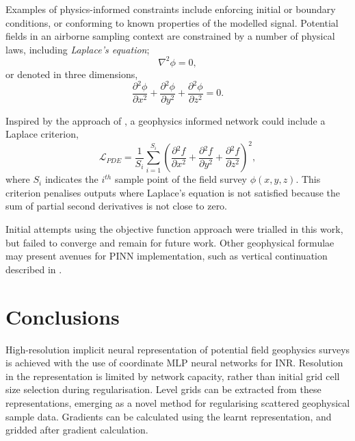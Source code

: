 \documentclass[manuscript.tex]{subfiles}
\begin{document}
Examples of physics-informed constraints include enforcing initial or boundary conditions, or conforming to known properties of the modelled signal.
Potential fields in an airborne sampling context are constrained by a number of physical laws, including \emph{Laplace's equation};
\[
    \nabla^2 \phi = 0,
\]
or denoted in three dimensions,
\begin{equation}
    \label{eqn:Laplace}
    \frac{\partial{}^2\phi}{\partial{}x^2} + \frac{\partial{}^2\phi}{\partial{}y^2} + \frac{\partial{}^2\phi}{\partial{}z^2} = 0.
\end{equation}

Inspired by the approach of \cite{raissiPhysicsinformedNeuralNetworks2019}, a geophysics informed network could include a Laplace criterion,
\begin{equation}
    \label{eqn:cri_laplace}
    \mathcal{L}_{PDE} = \frac{1}{S_i}\sum_{i=1}^{S_i} \left(\frac{\partial{}^2f}{\partial{}x^2} + \frac{\partial{}^2f}{\partial{}y^2} + \frac{\partial{}^2f}{\partial{}z^2}\right)^2,
\end{equation}
where \(S_i\) indicates the \(i^{th}\) sample point of the field survey \(\phi(x, y, z)\).
This criterion penalises outputs where Laplace's equation is not satisfied because the sum of partial second derivatives is not close to zero.


Initial attempts using the objective function approach were trialled in this work, but failed to converge and remain for future work.
Other geophysical formulae may present avenues for PINN implementation, such as vertical continuation described in \cite{blakelyPotentialTheoryGravity1996}.

\section{Conclusions}
High-resolution implicit neural representation of potential field geophysics surveys is achieved with the use of coordinate MLP neural networks for INR\@.
Resolution in the representation is limited by network capacity, rather than initial grid cell size selection during regularisation.
Level grids can be extracted from these representations, emerging as a novel method for regularising scattered geophysical sample data.
Gradients can be calculated using the learnt representation, and gridded after gradient calculation.
\end{document}
